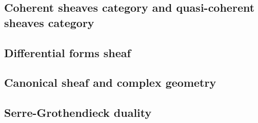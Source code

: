 \subsection{Coherent sheaves category and quasi-coherent sheaves category}
	
\subsection{Differential forms sheaf}
	
\subsection{Canonical sheaf and complex geometry}
	
\subsection{Serre-Grothendieck duality}
	
